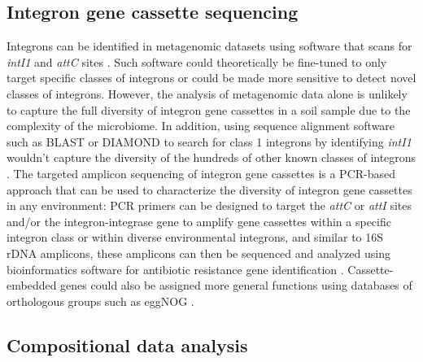 \subsection{Integron gene cassette sequencing}

Integrons can be identified in metagenomic datasets using software that scans for \textit{intI1} and \textit{attC} sites \parencite{Cury.2016}.
Such software could theoretically be fine-tuned to only target specific classes of integrons or could be made more sensitive to detect novel classes of integrons.
However, the analysis of metagenomic data alone is unlikely to capture the full diversity of integron gene cassettes in a soil sample due to the complexity of the microbiome.
In addition, using sequence alignment software such as BLAST or DIAMOND to search for class 1 integrons by identifying \textit{intI1} wouldn’t capture the diversity of the hundreds of other known classes of integrons \parencite{Altschul.1990, Buchfink.2015}.
The targeted amplicon sequencing of integron gene cassettes is a PCR-based approach that can be used to characterize the diversity of integron gene cassettes in any environment:
PCR primers can be designed to target the \textit{attC} or \textit{attI} sites and/or the integron-integrase gene to amplify gene cassettes within a specific integron class or within diverse environmental integrons, and similar to 16S rDNA amplicons, these amplicons can then be sequenced and analyzed using bioinformatics software for antibiotic resistance gene identification \parencite{Yang.2021, Ghaly.2019}.
Cassette-embedded genes could also be assigned more general functions using databases of orthologous groups such as eggNOG \parencite{HuertaCepas.2019}.

\subsection{Compositional data analysis}

